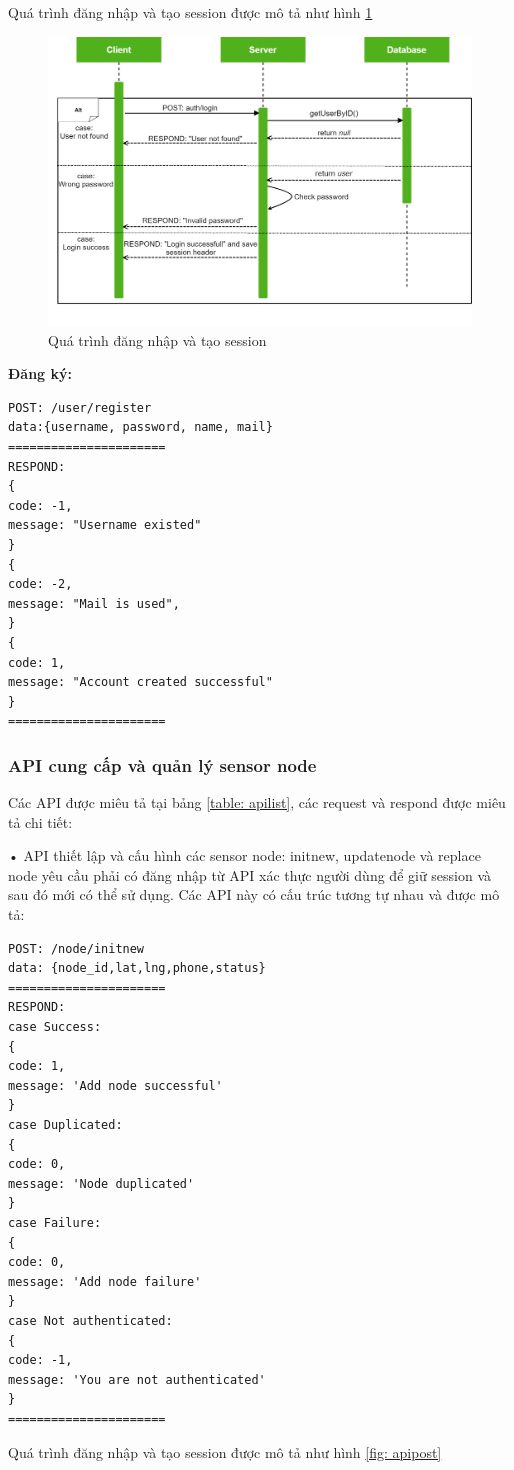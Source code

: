 Quá trình đăng nhập và tạo session được mô tả như hình \ref{fig: apilogin}

\begin{figure}[H]
	\centering    
	\includegraphics[width=1\textwidth]{apilogin}
	\caption[Quá trình đăng nhập và tạo session]{Quá trình đăng nhập và tạo session}
	\label{fig: apilogin}
\end{figure}


\textbf{Đăng ký:}

\begin{Verbatim}[xleftmargin=2em]
POST: /user/register
data:{username, password, name, mail}
======================	
RESPOND:
{
code: -1,
message: "Username existed"
}
{
code: -2,
message: "Mail is used",
}
{
code: 1,
message: "Account created successful"
}
======================	
\end{Verbatim}
\subsubsection*{API cung cấp và quản lý sensor node}
Các API được miêu tả tại bảng \ref{table: apilist}, các request và respond được miêu tả chi tiết:

• API thiết lập và cấu hình các sensor node: initnew, updatenode và replace node yêu cầu phải có đăng nhập từ API xác thực người dùng để giữ session và sau đó mới có thể sử dụng. Các API này có cấu trúc tương tự nhau và được mô tả:
\begin{Verbatim}[xleftmargin=2em]
POST: /node/initnew
data: {node_id,lat,lng,phone,status}
======================
RESPOND:
case Success:
{
code: 1,
message: 'Add node successful'
}
case Duplicated:
{
code: 0,
message: 'Node duplicated'
}
case Failure:
{
code: 0,
message: 'Add node failure'
}
case Not authenticated:
{
code: -1,
message: 'You are not authenticated'
}
======================	

\end{Verbatim}
Quá trình đăng nhập và tạo session được mô tả như hình \ref{fig: apipost}

